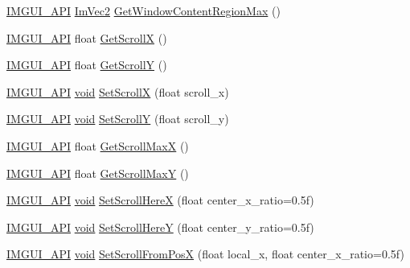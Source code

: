 \begin{DoxyCompactItemize}
\item 
\hyperlink{imgui_8h_a43829975e84e45d1149597467a14bbf5}{I\+M\+G\+U\+I\+\_\+\+A\+PI} \hyperlink{structImVec2}{Im\+Vec2} \hyperlink{namespaceImGui_a96ce6060592d3ef975594357e650adc6}{Get\+Window\+Content\+Region\+Max} ()
\item 
\hyperlink{imgui_8h_a43829975e84e45d1149597467a14bbf5}{I\+M\+G\+U\+I\+\_\+\+A\+PI} float \hyperlink{namespaceImGui_a6f88335d87da3be81dc6e24cb1812923}{Get\+ScrollX} ()
\item 
\hyperlink{imgui_8h_a43829975e84e45d1149597467a14bbf5}{I\+M\+G\+U\+I\+\_\+\+A\+PI} float \hyperlink{namespaceImGui_a3c924a2eeb8b2ddfb40ea17be7ea12a6}{Get\+ScrollY} ()
\item 
\hyperlink{imgui_8h_a43829975e84e45d1149597467a14bbf5}{I\+M\+G\+U\+I\+\_\+\+A\+PI} \hyperlink{imgui__impl__opengl3__loader_8h_ac668e7cffd9e2e9cfee428b9b2f34fa7}{void} \hyperlink{namespaceImGui_a0796750de8c50555d895f63e79ac87f0}{Set\+ScrollX} (float scroll\+\_\+x)
\item 
\hyperlink{imgui_8h_a43829975e84e45d1149597467a14bbf5}{I\+M\+G\+U\+I\+\_\+\+A\+PI} \hyperlink{imgui__impl__opengl3__loader_8h_ac668e7cffd9e2e9cfee428b9b2f34fa7}{void} \hyperlink{namespaceImGui_a41833555962807384432e6fc94d46ec9}{Set\+ScrollY} (float scroll\+\_\+y)
\item 
\hyperlink{imgui_8h_a43829975e84e45d1149597467a14bbf5}{I\+M\+G\+U\+I\+\_\+\+A\+PI} float \hyperlink{namespaceImGui_af472cb090157c22e65a0aa1662b9f3d0}{Get\+Scroll\+MaxX} ()
\item 
\hyperlink{imgui_8h_a43829975e84e45d1149597467a14bbf5}{I\+M\+G\+U\+I\+\_\+\+A\+PI} float \hyperlink{namespaceImGui_ab34c0d5c63908a7ff50923151730f76a}{Get\+Scroll\+MaxY} ()
\item 
\hyperlink{imgui_8h_a43829975e84e45d1149597467a14bbf5}{I\+M\+G\+U\+I\+\_\+\+A\+PI} \hyperlink{imgui__impl__opengl3__loader_8h_ac668e7cffd9e2e9cfee428b9b2f34fa7}{void} \hyperlink{namespaceImGui_a317a44e9126aa24099abc5cfc7d391ec}{Set\+Scroll\+HereX} (float center\+\_\+x\+\_\+ratio=0.\+5f)
\item 
\hyperlink{imgui_8h_a43829975e84e45d1149597467a14bbf5}{I\+M\+G\+U\+I\+\_\+\+A\+PI} \hyperlink{imgui__impl__opengl3__loader_8h_ac668e7cffd9e2e9cfee428b9b2f34fa7}{void} \hyperlink{namespaceImGui_ac74487b4d75580ca637659103fef1368}{Set\+Scroll\+HereY} (float center\+\_\+y\+\_\+ratio=0.\+5f)
\item 
\hyperlink{imgui_8h_a43829975e84e45d1149597467a14bbf5}{I\+M\+G\+U\+I\+\_\+\+A\+PI} \hyperlink{imgui__impl__opengl3__loader_8h_ac668e7cffd9e2e9cfee428b9b2f34fa7}{void} \hyperlink{namespaceImGui_ad244660a2f3f2999f645feb9fbdfe0ec}{Set\+Scroll\+From\+PosX} (float local\+\_\+x, float center\+\_\+x\+\_\+ratio=0.\+5f)

\end{DoxyCompactItemize}
